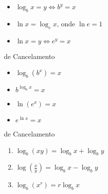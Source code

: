 \begin{itemize}
  \item {$\log_b x = y \iff b^y = x$}
  \item {$\ln x = \log_e x \textrm{, onde } \ln e = 1$}
  \item {$\ln x = y \iff e^y = x$}
\end{itemize}

 de Cancelamento
\begin{itemize}
  \item {$\log_b(b^x) = x$}
  \item {$b^{\log_b x} = x$}
  \item {$\ln(e^x) = x$}
  \item {$e^{\ln x} = x$}
\end{itemize}
 de Cancelamento
\begin{enumerate}
  \item {$\log_b (xy) = \log_b x + \log_b y$}
  \item {$\log \left( \frac{x}{y}\right) = \log_b x - \log_b y$}
  \item {$\log_b(x^r) = r \log_b x$}
\end{enumerate}
